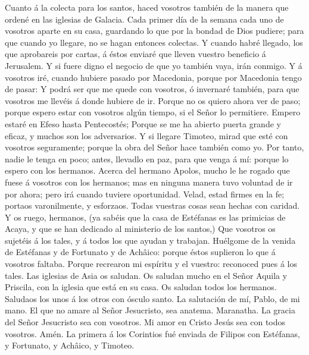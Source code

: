  Cuanto á la colecta para los santos, haced vosotros
también de la manera que ordené en las iglesias de Galacia.
 Cada primer día de la semana cada uno de vosotros aparte
en su casa, guardando lo que por la bondad de Dios pudiere; para que
cuando yo llegare, no se hagan entonces colectas.  Y
cuando habré llegado, los que aprobareis por cartas, á éstos enviaré que
lleven vuestro beneficio á Jerusalem.  Y si fuere digno el
negocio de que yo también vaya, irán conmigo.  Y á
vosotros iré, cuando hubiere pasado por Macedonia, porque por Macedonia
tengo de pasar:  Y podrá ser que me quede con vosotros, ó
invernaré también, para que vosotros me llevéis á donde hubiere de ir.
 Porque no os quiero ahora ver de paso; porque espero
estar con vosotros algún tiempo, si el Señor lo permitiere.
 Empero estaré en Efeso hasta Pentecostés; 
Porque se me ha abierto puerta grande y eficaz, y muchos son los
adversarios.  Y si llegare Timoteo, mirad que esté con
vosotros seguramente; porque la obra del Señor hace también como yo.
 Por tanto, nadie le tenga en poco; antes, llevadlo en
paz, para que venga á mí: porque lo espero con los hermanos.
 Acerca del hermano Apolos, mucho le he rogado que fuese
á vosotros con los hermanos; mas en ninguna manera tuvo voluntad de ir
por ahora; pero irá cuando tuviere oportunidad.  Velad,
estad firmes en la fe; portaos varonilmente, y esforzaos.
 Todas vuestras cosas sean hechas con caridad.
 Y os ruego, hermanos, (ya sabéis que la casa de
Estéfanas es las primicias de Acaya, y que se han dedicado al ministerio
de los santos,)  Que vosotros os sujetéis á los tales, y
á todos los que ayudan y trabajan.  Huélgome de la venida
de Estéfanas y de Fortunato y de Achâico: porque éstos suplieron lo que
á vosotros faltaba.  Porque recrearon mi espíritu y el
vuestro: reconoced pues á los tales.  Las iglesias de
Asia os saludan. Os saludan mucho en el Señor Aquila y Priscila, con la
iglesia que está en su casa.  Os saludan todos los
hermanos. Saludaos los unos á los otros con ósculo santo.
 La salutación de mí, Pablo, de mi mano. 
El que no amare al Señor Jesucristo, sea anatema. Maranatha.
 La gracia del Señor Jesucristo sea con vosotros.
 Mi amor en Cristo Jesús sea con todos vosotros. Amén. La
primera á los Corintios fué enviada de Filipos con Estéfanas, y
Fortunato, y Achâico, y Timoteo.

